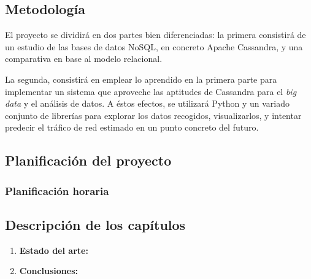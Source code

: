 \subsection{Metodología}
\label{subsec:metodologia}

El proyecto se dividirá en dos partes bien diferenciadas: la primera consistirá
de un estudio de las bases de datos NoSQL, en concreto Apache Cassandra, y una
comparativa en base al modelo relacional.

La segunda, consistirá en emplear lo aprendido en la primera parte para
implementar un sistema que aproveche las aptitudes de Cassandra para el
\emph{big data} y el análisis de datos. A éstos efectos, se utilizará Python y
un variado conjunto de librerías para explorar los datos recogidos,
visualizarlos, y intentar predecir el tráfico de red estimado en un punto
concreto del futuro.



\subsection{Planificación del proyecto}
\label{subsec:planificació}


% 

\subsubsection{Planificación horaria}
\label{subsubsec:hores}

\subsection{Descripción de los capítulos}
\label{subsec:chaps}


\begin{enumerate}
    \item \textbf{Estado del arte: } 
    \item \textbf{Conclusiones: } 
\end{enumerate}
\clearpage
